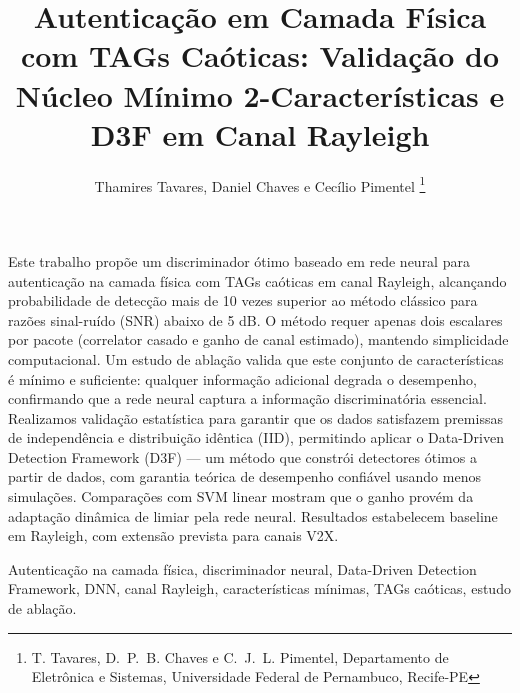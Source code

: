 \documentclass{sbrt}
\begin{document}
\title{Autenticação em Camada Física com TAGs Caóticas: Validação do Núcleo Mínimo 2-Características e D3F em Canal Rayleigh}

\author{Thamires Tavares, Daniel Chaves e Cecílio Pimentel
\thanks{T. Tavares, D.~P.~B. Chaves e C.~J.~L. Pimentel, Departamento de Eletrônica e Sistemas, Universidade Federal de Pernambuco, Recife-PE}%
}

\maketitle


\begin{resumo}
Este trabalho propõe um discriminador ótimo baseado em rede neural para autenticação na camada física com TAGs caóticas em canal Rayleigh, alcançando probabilidade de detecção mais de 10 vezes superior ao método clássico para razões sinal-ruído (SNR) abaixo de 5 dB. O método requer apenas dois escalares por pacote (correlator casado e ganho de canal estimado), mantendo simplicidade computacional. Um estudo de ablação valida que este conjunto de características é mínimo e suficiente: qualquer informação adicional degrada o desempenho, confirmando que a rede neural captura a informação discriminatória essencial. Realizamos validação estatística para garantir que os dados satisfazem premissas de independência e distribuição idêntica (IID), permitindo aplicar o Data-Driven Detection Framework (D3F) --- um método que constrói detectores ótimos a partir de dados, com garantia teórica de desempenho confiável usando menos simulações. Comparações com SVM linear mostram que o ganho provém da adaptação dinâmica de limiar pela rede neural. Resultados estabelecem baseline em Rayleigh, com extensão prevista para canais V2X.
\end{resumo}

\begin{chave}
Autenticação na camada física, discriminador neural, Data-Driven Detection Framework, DNN, canal Rayleigh, características mínimas, TAGs caóticas, estudo de ablação.
\end{chave}
\end{document}
